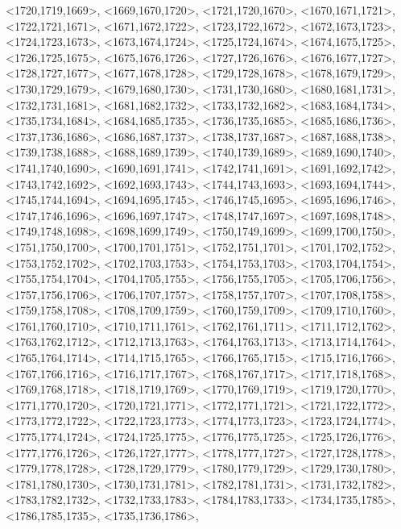 \documentclass[a4paper,10pt]{article}
\begin{document}
\begin{eulernotebook}
\begin{euleroutput}
  <1720,1719,1669>,
  <1669,1670,1720>,
  <1721,1720,1670>,
  <1670,1671,1721>,
  <1722,1721,1671>,
  <1671,1672,1722>,
  <1723,1722,1672>,
  <1672,1673,1723>,
  <1724,1723,1673>,
  <1673,1674,1724>,
  <1725,1724,1674>,
  <1674,1675,1725>,
  <1726,1725,1675>,
  <1675,1676,1726>,
  <1727,1726,1676>,
  <1676,1677,1727>,
  <1728,1727,1677>,
  <1677,1678,1728>,
  <1729,1728,1678>,
  <1678,1679,1729>,
  <1730,1729,1679>,
  <1679,1680,1730>,
  <1731,1730,1680>,
  <1680,1681,1731>,
  <1732,1731,1681>,
  <1681,1682,1732>,
  <1733,1732,1682>,
  <1683,1684,1734>,
  <1735,1734,1684>,
  <1684,1685,1735>,
  <1736,1735,1685>,
  <1685,1686,1736>,
  <1737,1736,1686>,
  <1686,1687,1737>,
  <1738,1737,1687>,
  <1687,1688,1738>,
  <1739,1738,1688>,
  <1688,1689,1739>,
  <1740,1739,1689>,
  <1689,1690,1740>,
  <1741,1740,1690>,
  <1690,1691,1741>,
  <1742,1741,1691>,
  <1691,1692,1742>,
  <1743,1742,1692>,
  <1692,1693,1743>,
  <1744,1743,1693>,
  <1693,1694,1744>,
  <1745,1744,1694>,
  <1694,1695,1745>,
  <1746,1745,1695>,
  <1695,1696,1746>,
  <1747,1746,1696>,
  <1696,1697,1747>,
  <1748,1747,1697>,
  <1697,1698,1748>,
  <1749,1748,1698>,
  <1698,1699,1749>,
  <1750,1749,1699>,
  <1699,1700,1750>,
  <1751,1750,1700>,
  <1700,1701,1751>,
  <1752,1751,1701>,
  <1701,1702,1752>,
  <1753,1752,1702>,
  <1702,1703,1753>,
  <1754,1753,1703>,
  <1703,1704,1754>,
  <1755,1754,1704>,
  <1704,1705,1755>,
  <1756,1755,1705>,
  <1705,1706,1756>,
  <1757,1756,1706>,
  <1706,1707,1757>,
  <1758,1757,1707>,
  <1707,1708,1758>,
  <1759,1758,1708>,
  <1708,1709,1759>,
  <1760,1759,1709>,
  <1709,1710,1760>,
  <1761,1760,1710>,
  <1710,1711,1761>,
  <1762,1761,1711>,
  <1711,1712,1762>,
  <1763,1762,1712>,
  <1712,1713,1763>,
  <1764,1763,1713>,
  <1713,1714,1764>,
  <1765,1764,1714>,
  <1714,1715,1765>,
  <1766,1765,1715>,
  <1715,1716,1766>,
  <1767,1766,1716>,
  <1716,1717,1767>,
  <1768,1767,1717>,
  <1717,1718,1768>,
  <1769,1768,1718>,
  <1718,1719,1769>,
  <1770,1769,1719>,
  <1719,1720,1770>,
  <1771,1770,1720>,
  <1720,1721,1771>,
  <1772,1771,1721>,
  <1721,1722,1772>,
  <1773,1772,1722>,
  <1722,1723,1773>,
  <1774,1773,1723>,
  <1723,1724,1774>,
  <1775,1774,1724>,
  <1724,1725,1775>,
  <1776,1775,1725>,
  <1725,1726,1776>,
  <1777,1776,1726>,
  <1726,1727,1777>,
  <1778,1777,1727>,
  <1727,1728,1778>,
  <1779,1778,1728>,
  <1728,1729,1779>,
  <1780,1779,1729>,
  <1729,1730,1780>,
  <1781,1780,1730>,
  <1730,1731,1781>,
  <1782,1781,1731>,
  <1731,1732,1782>,
  <1783,1782,1732>,
  <1732,1733,1783>,
  <1784,1783,1733>,
  <1734,1735,1785>,
  <1786,1785,1735>,
  <1735,1736,1786>,

\end{euleroutput}
\end{eulernotebook}
\end{document}
